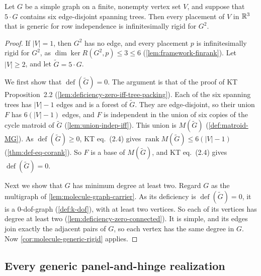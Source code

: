 \begin{corollary}
  \label{cor:molecule-generic-square-packing}
  \leanok
  Let $G$ be a simple graph on a finite, nonempty vertex set $V$, and
  suppose that $5 \cdot G$ contains six edge-disjoint spanning trees.
  Then every placement of $V$ in ${\mathbb{R}}^3$ that is generic for row
  independence is infinitesimally rigid for $G^2$.
\end{corollary}
\begin{proof}
  \leanok
  If $|V| = 1$, then $G^2$ has no edge, and every placement $p$ is
  infinitesimally rigid for $G^2$, as
  $\dim \ker R(G^2, p) \le 3 \le 6$ (\cref{lem:framework-finrank}). Let
  $|V| \ge 2$, and let $\tilde G = 5 \cdot G$.

  We first show that $\operatorname{def}(\tilde G) = 0$. The argument
  is that of the proof of KT Proposition~2.2
  (\cref{lem:deficiency-zero-iff-tree-packing}). Each of the six
  spanning trees has $|V| - 1$ edges and is a forest of $\tilde G$.
  They are edge-disjoint, so their union $F$ has $6(|V| - 1)$ edges,
  and $F$ is independent in the union of six copies of the cycle
  matroid of $\tilde G$ (\cref{lem:union-indep-iff}). This union is
  $M(\tilde G)$ (\cref{def:matroid-MG}). As
  $\operatorname{def}(\tilde G) \ge 0$, KT eq.~(2.4) gives
  $\operatorname{rank} M(\tilde G) \le 6(|V| - 1)$
  (\cref{thm:def-eq-corank}). So $F$ is a base of $M(\tilde G)$, and KT
  eq.~(2.4) gives $\operatorname{def}(\tilde G) = 0$.

  Next we show that $G$ has minimum degree at least two. Regard $G$ as
  the multigraph of \cref{lem:molecule-graph-carrier}. As its
  deficiency is $\operatorname{def}(\tilde G) = 0$, it is a
  $0$-dof-graph (\cref{def:k-dof}), with at least two vertices. So each
  of its vertices has degree at least two
  (\cref{lem:deficiency-zero-connected}). It is
  simple, and its edges join exactly the adjacent pairs of $G$, so each
  vertex has the same degree in $G$. Now
  \cref{cor:molecule-generic-rigid} applies.
\end{proof}

\subsection{Every generic panel-and-hinge realization}
\label{sec:generic-lift-panel}

